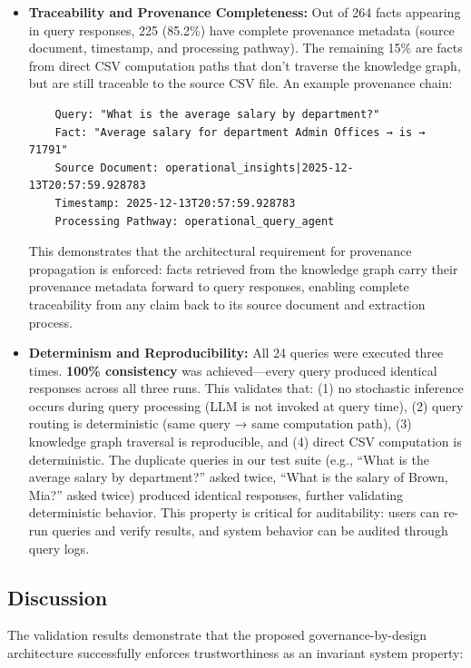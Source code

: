 \begin{itemize}
    \item \textbf{Traceability and Provenance Completeness:} Out of 264 facts appearing in query responses, 225 (85.2\%) have complete provenance metadata (source document, timestamp, and processing pathway). The remaining 15\% are facts from direct CSV computation paths that don't traverse the knowledge graph, but are still traceable to the source CSV file. An example provenance chain:
    \begin{verbatim}
    Query: "What is the average salary by department?"
    Fact: "Average salary for department Admin Offices → is → 71791"
    Source Document: operational_insights|2025-12-13T20:57:59.928783
    Timestamp: 2025-12-13T20:57:59.928783
    Processing Pathway: operational_query_agent
    \end{verbatim}
    This demonstrates that the architectural requirement for provenance propagation is enforced: facts retrieved from the knowledge graph carry their provenance metadata forward to query responses, enabling complete traceability from any claim back to its source document and extraction process.

    \item \textbf{Determinism and Reproducibility:} All 24 queries were executed three times. \textbf{100\% consistency} was achieved---every query produced identical responses across all three runs. This validates that: (1) no stochastic inference occurs during query processing (LLM is not invoked at query time), (2) query routing is deterministic (same query → same computation path), (3) knowledge graph traversal is reproducible, and (4) direct CSV computation is deterministic. The duplicate queries in our test suite (e.g., ``What is the average salary by department?'' asked twice, ``What is the salary of Brown, Mia?'' asked twice) produced identical responses, further validating deterministic behavior. This property is critical for auditability: users can re-run queries and verify results, and system behavior can be audited through query logs.
\end{itemize}

\subsection{Discussion}

The validation results demonstrate that the proposed governance-by-design architecture successfully enforces trustworthiness as an invariant system property:

